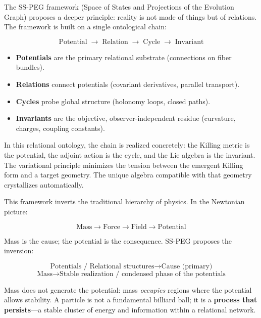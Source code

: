 The SS-PEG framework (Space of States and Projections of the Evolution Graph) proposes a deeper principle: reality is not made of things but of relations. The framework is built on a single ontological chain:

\begin{equation}
\text{Potential} \;\to\; \text{Relation} \;\to\; \text{Cycle} \;\to\; \text{Invariant}
\end{equation}

\begin{itemize}
\item \textbf{Potentials} are the primary relational substrate (connections on fiber bundles).
\item \textbf{Relations} connect potentials (covariant derivatives, parallel transport).
\item \textbf{Cycles} probe global structure (holonomy loops, closed paths).
\item \textbf{Invariants} are the objective, observer-independent residue (curvature, charges, coupling constants).
\end{itemize}

In this relational ontology, the chain is realized concretely: the Killing metric is the potential, the adjoint action is the cycle, and the Lie algebra is the invariant. The variational principle minimizes the tension between the emergent Killing form and a target geometry. The unique algebra compatible with that geometry crystallizes automatically.

This framework inverts the traditional hierarchy of physics. In the Newtonian picture:

\begin{equation}
\text{Mass} \longrightarrow \text{Force} \longrightarrow \text{Field} \longrightarrow \text{Potential}
\end{equation}

Mass is the cause; the potential is the consequence. SS-PEG proposes the inversion:

\begin{equation}
\text{Potentials / Relational structures} \longrightarrow \text{Cause (primary)}
\end{equation}
$$
\text{Mass} \longrightarrow \text{Stable realization / condensed phase of the potentials}
$$

Mass does not generate the potential: mass \textit{occupies} regions where the potential allows stability. A particle is not a fundamental billiard ball; it is a \textbf{process that persists}---a stable cluster of energy and information within a relational network.

